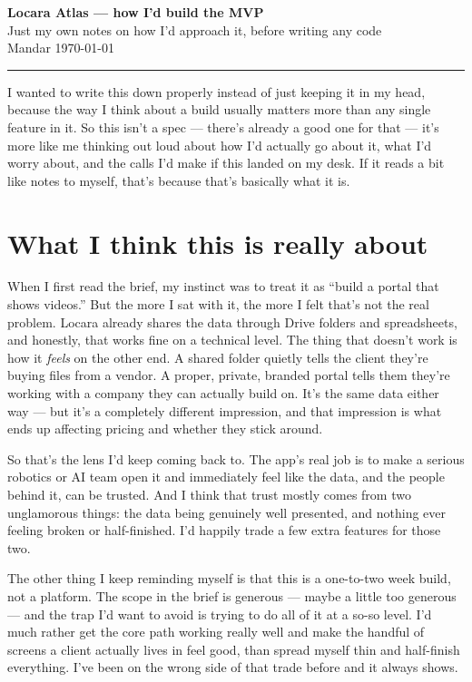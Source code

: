 \documentclass[a4paper,11pt]{article}
\begin{document}
\begin{center}
    {\LARGE\bfseries\color{ink} Locara Atlas --- how I'd build the MVP}\\[6pt]
    {\color{soft} Just my own notes on how I'd approach it, before writing any code}\\[10pt]
    {\small\color{soft} Mandar \quad\textbullet\quad \today}
\end{center}
\vspace{6pt}
\hrule
\vspace{14pt}

I wanted to write this down properly instead of just keeping it in my head, because the way I think about a build usually matters more than any single feature in it. So this isn't a spec --- there's already a good one for that --- it's more like me thinking out loud about how I'd actually go about it, what I'd worry about, and the calls I'd make if this landed on my desk. If it reads a bit like notes to myself, that's because that's basically what it is.

\section{What I think this is really about}

When I first read the brief, my instinct was to treat it as ``build a portal that shows videos.'' But the more I sat with it, the more I felt that's not the real problem. Locara already shares the data through Drive folders and spreadsheets, and honestly, that works fine on a technical level. The thing that doesn't work is how it \textit{feels} on the other end. A shared folder quietly tells the client they're buying files from a vendor. A proper, private, branded portal tells them they're working with a company they can actually build on. It's the same data either way --- but it's a completely different impression, and that impression is what ends up affecting pricing and whether they stick around.

So that's the lens I'd keep coming back to. The app's real job is to make a serious robotics or AI team open it and immediately feel like the data, and the people behind it, can be trusted. And I think that trust mostly comes from two unglamorous things: the data being genuinely well presented, and nothing ever feeling broken or half-finished. I'd happily trade a few extra features for those two.

The other thing I keep reminding myself is that this is a one-to-two week build, not a platform. The scope in the brief is generous --- maybe a little too generous --- and the trap I'd want to avoid is trying to do all of it at a so-so level. I'd much rather get the core path working really well and make the handful of screens a client actually lives in feel good, than spread myself thin and half-finish everything. I've been on the wrong side of that trade before and it always shows.
\end{document}
